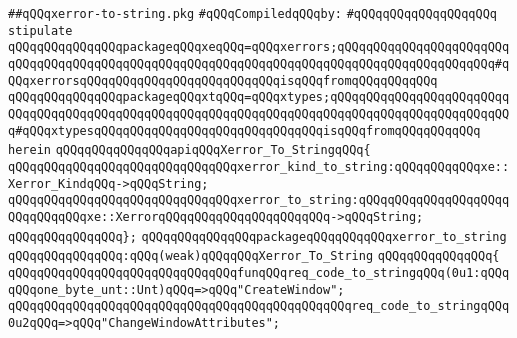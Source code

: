 \label{src/lib/x-kit/xclient/src/to-string/xerror-to-string.pkg}
\verb|##qQQqxerror-to-string.pkg|\newline
\newline
\verb|#qQQqCompiledqQQqby:|\newline
\verb|#qQQqqQQqqQQqqQQqqQQq|\newline
\newline
\newline
\verb|stipulate|\newline
\verb|qQQqqQQqqQQqqQQqpackageqQQqxeqQQq=qQQqxerrors;qQQqqQQqqQQqqQQqqQQqqQQqqQQqqQQqqQQqqQQqqQQqqQQqqQQqqQQqqQQqqQQqqQQqqQQqqQQqqQQqqQQqqQQqqQQq#qQQqxerrorsqQQqqQQqqQQqqQQqqQQqqQQqqQQqisqQQqfromqQQqqQQqqQQq|\newline
\verb|qQQqqQQqqQQqqQQqpackageqQQqxtqQQq=qQQqxtypes;qQQqqQQqqQQqqQQqqQQqqQQqqQQqqQQqqQQqqQQqqQQqqQQqqQQqqQQqqQQqqQQqqQQqqQQqqQQqqQQqqQQqqQQqqQQqqQQq#qQQqxtypesqQQqqQQqqQQqqQQqqQQqqQQqqQQqqQQqisqQQqfromqQQqqQQqqQQq|\newline
\verb|herein|\newline
\newline
\verb|qQQqqQQqqQQqqQQqapiqQQqXerror_To_StringqQQq{|\newline
\verb|qQQqqQQqqQQqqQQqqQQqqQQqqQQqqQQqxerror_kind_to_string:qQQqqQQqqQQqxe::Xerror_KindqQQq->qQQqString;|\newline
\verb|qQQqqQQqqQQqqQQqqQQqqQQqqQQqqQQqxerror_to_string:qQQqqQQqqQQqqQQqqQQqqQQqqQQqqQQqxe::XerrorqQQqqQQqqQQqqQQqqQQqqQQq->qQQqString;|\newline
\verb|qQQqqQQqqQQqqQQq};|\newline
\newline
\newline
\newline
\verb|qQQqqQQqqQQqqQQqpackageqQQqqQQqqQQqxerror_to_string|\newline
\verb|qQQqqQQqqQQqqQQq:qQQq(weak)qQQqqQQqXerror_To_String|\newline
\verb|qQQqqQQqqQQqqQQq{|\newline
\verb|qQQqqQQqqQQqqQQqqQQqqQQqqQQqqQQqfunqQQqreq_code_to_stringqQQq(0u1:qQQqqQQqone_byte_unt::Unt)qQQq=>qQQq"CreateWindow";|\newline
\verb|qQQqqQQqqQQqqQQqqQQqqQQqqQQqqQQqqQQqqQQqqQQqqQQqreq_code_to_stringqQQq0u2qQQq=>qQQq"ChangeWindowAttributes";|\newline
